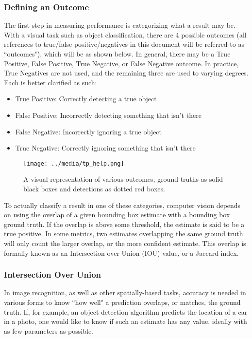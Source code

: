 \subsubsection{Defining an Outcome}
The first step in measuring performance is categorizing what a result may be. With a visual task such as object classification, there are 4 possible outcomes (all references to true/false positive/negatives in this document will be referred to as ``outcomes"), which will be  as shown below. In general, there may be a True Positive, False Positive, True Negative, or False Negative outcome. In practice, True Negatives are not used, and the remaining three are used to varying degrees. Each is better clarified as such:
\begin{itemize} \itemsep=-.5em
	\item True Positive: Correctly detecting a true object
	\item False Positive: Incorrectly detecting something that isn't there
	\item False Negative: Incorrectly ignoring a true object
	\item True Negative: Correctly ignoring something that isn't there
\end{itemize}

\begin{figure}[H]
	\centering
	\texttt{[image: ../media/tp\_help.png]}
	\caption{A visual representation of various outcomes, ground truths as solid black boxes and detections as dotted red boxes.}
	\label{tp_help}
\end{figure}

To actually classify a result in one of these categories, computer vision depends on using the overlap of a given bounding box estimate with a bounding box ground truth. If the overlap is above some threshold, the estimate is said to be a true positive. In some metrics, two estimates overlapping the same ground truth will only count the larger overlap, or the more confident estimate. This overlap is formally known as an Intersection over Union (IOU) value, or a Jaccard index.

\subsubsection{Intersection Over Union}
In image recognition, as well as other spatially-based tasks, accuracy is needed in various forms to know ``how well" a prediction overlaps, or matches, the ground truth. If, for example, an object-detection algorithm predicts the location of a car in a photo, one would like to know if such an estimate has any value, ideally with as few parameters as possible.

